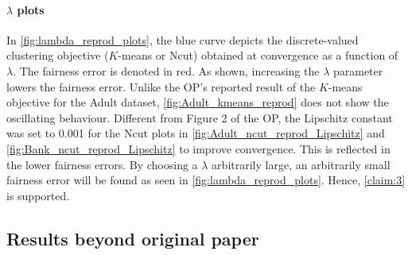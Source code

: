 \paragraph{$\lambda$ plots}
In \autoref{fig:lambda_reprod_plots}, the blue curve depicts the discrete-valued clustering objective ($K$-means or Ncut) obtained at convergence as a function of $\lambda$. The fairness error is denoted in red. As shown, increasing the $\lambda$ parameter lowers the fairness error. Unlike the OP's reported result of the $K$-means objective for the Adult dataset, \autoref{fig:Adult_kmeans_reprod} does not show the oscillating behaviour. Different from Figure 2 of the OP, the Lipschitz constant was set to 0.001 for the Ncut plots in \autoref{fig:Adult_ncut_reprod_Lipschitz} and \autoref{fig:Bank_ncut_reprod_Lipschitz} to improve convergence. This is reflected in the lower fairness errors. By choosing a $\lambda$ arbitrarily large, an arbitrarily small fairness error will be found as seen in \ref{fig:lambda_reprod_plots}. Hence, \ref{claim:3} is supported.






\subsection{Results beyond original paper}


